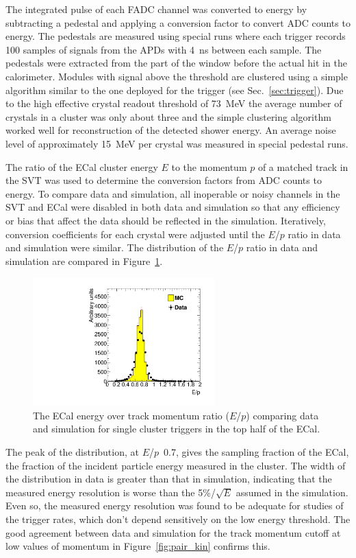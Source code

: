 \documentclass[final,3p,times,twocolumn]{elsarticle}
\begin{document}
The integrated pulse of each FADC channel was converted to energy by  
subtracting a pedestal and applying a conversion factor to convert ADC counts to energy. 
The pedestals are measured using special runs where each trigger records 100 samples of signals 
from the APDs with 4~ns between each sample. The pedestals were extracted from the 
part of the window before the actual hit in the calorimeter. Modules with signal above the threshold  
are clustered using a simple algorithm similar to the one 
deployed for the trigger (see Sec.~\ref{sec:trigger}). Due to the high effective crystal readout threshold 
of 73~MeV the average number of crystals in a cluster was only about three and the simple clustering 
algorithm worked well for reconstruction of the detected shower energy. An average noise level of 
approximately 15~MeV per crystal was measured in special pedestal runs. 


The ratio of the ECal cluster energy $E$ to the momentum $p$ of a matched track in the SVT was used 
to determine the conversion factors from ADC counts to energy. To compare data and simulation, all 
inoperable or noisy channels in the SVT and ECal were disabled in both data and simulation so that 
any efficiency or bias that affect the data should be reflected in the simulation. 
Iteratively, conversion coefficients for each crystal were adjusted until the $E$/$p$ ratio in data and 
simulation were similar. The distribution of the $E$/$p$ ratio in data and simulation are compared in 
Figure~\ref{fig:gains}. 
\begin{figure}[]
\begin{center}
	\includegraphics[width=7cm]{h_ep_data_0_h_ep_MC_0_dataMC_1351-v6-v6gains_2-trig-top-cl600reg0.pdf}
	\caption{The ECal energy over track momentum ratio ($E$/$p$) comparing data and simulation 
	for single cluster triggers in the top half of the ECal.
	\label{fig:gains}}
\end{center}
\end{figure}
The peak of the distribution, at $E$/$p$~0.7, gives the sampling fraction of the ECal, the fraction of the 
incident particle energy measured in the cluster. The width of the distribution in data is greater than that in 
simulation, indicating that the measured energy resolution is worse than the 5\%/$\sqrt{E}$  assumed in the 
simulation. Even so, the measured energy resolution was found to be adequate for studies of the trigger rates, 
which don't depend sensitively on the low energy threshold. The good agreement between data and 
simulation for the track momentum cutoff at low values of momentum in Figure~\ref{fig:pair_kin} confirms this.
\end{document}

